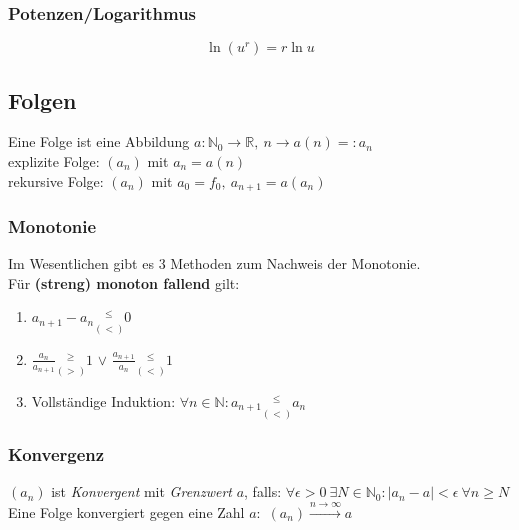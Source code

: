 \documentclass[6pt,a4paper]{scrartcl}
\newcommand{\abs}[1]{\ensuremath{\left\vert#1\right\vert}}
\begin{document}
\begin{multicols*}{4}
\subsubsection{Potenzen/Logarithmus}
\begin{equation*}
\ln(u^r)=r\ln u
\end{equation*}

\subsection{Folgen}
Eine Folge ist eine Abbildung $a: \mathbb N_0 \rightarrow \mathbb R,\ n \rightarrow a(n) =: a_n$\\
explizite Folge: $(a_n)$ mit $a_n=a(n)$\\ rekursive Folge: $(a_n)$ mit $a_0=f_0,\  a_{n+1}=a(a_n)$\\

\subsubsection{Monotonie}
Im Wesentlichen gibt es 3 Methoden zum Nachweis der Monotonie.\\
Für \textbf{(streng) monoton fallend} gilt:
\begin{enumerate}\itemsep0pt
\item $a_{n+1} - a_n \underset{(<)}{^{\le}} 0$
\item $\frac{a_n}{a_{n+1}} \underset{(>)}{^{\ge}} 1$ \qquad $\lor$ \qquad $\frac{a_{n+1}}{a_n} \underset{(<)}{^{\le}} 1$
\item Vollständige Induktion: $\forall n \in \mathbb{N}: a_{n+1}\underset{(<)}{^{\le}} a_n$
\end{enumerate}

\subsubsection{Konvergenz}
$(a_n)$ ist \emph{Konvergent} mit \emph{Grenzwert} $a$, falls: $\forall \epsilon > 0 \ \exists N  \in \mathbb N_0:  \abs{a_n -a} < \epsilon \ \forall n \ge N$\\
Eine Folge konvergiert gegen eine Zahl $a$:\ $(a_n) \overset{n \rightarrow \infty}{\longrightarrow} a$\\

\end{multicols*}
\end{document}
